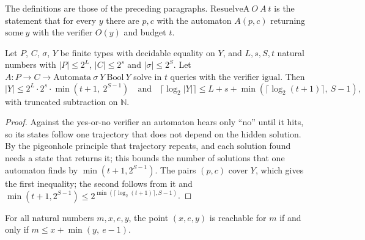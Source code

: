 \begin{definition}
  \label{def:dynamics-cube}
  \leanok
  The definitions are those of the preceding paragraphs. $\mathrm{ResuelveA}\ O\ A\ t$ is the
  statement that for every $y$ there are $p, c$ with the automaton $A(p,c)$ returning
  $\mathrm{some}\ y$ with the verifier $O(y)$ and budget $t$.
  \own{}
\end{definition}

\begin{theorem}
  \label{thm:dynamics-cube-law}
  \leanok
  Let $P$, $C$, $\sigma$, $Y$ be finite types with decidable equality on $Y$, and $L, s, S, t$
  natural numbers with $|P| \le 2^L$, $|C| \le 2^s$ and $|\sigma| \le 2^S$. Let
  $A : P \to C \to \mathrm{Automata}\ \sigma\ Y\ \mathrm{Bool}\ Y$ solve in $t$ queries with the
  verifier $\mathrm{igual}$. Then
  \[
    |Y| \le 2^L \cdot 2^s \cdot \min(t+1,\ 2^{S-1})
    \quad\text{and}\quad
    \lceil \log_2 |Y| \rceil \le L + s + \min(\lceil \log_2 (t+1) \rceil,\ S - 1),
  \]
  with truncated subtraction on $\mathbb{N}$.
  \own{}
\end{theorem}

\begin{proof}
  \leanok
  Against the yes-or-no verifier an automaton hears only ``no'' until it hits, so its states follow
  one trajectory that does not depend on the hidden solution. By the pigeonhole principle that
  trajectory repeats, and each solution found needs a state that returns it; this bounds the number
  of solutions that one automaton finds by $\min(t+1, 2^{S-1})$. The pairs $(p,c)$ cover $Y$, which
  gives the first inequality; the second follows from it and $\min(t+1, 2^{S-1}) \le
  2^{\min(\lceil \log_2 (t+1) \rceil, S-1)}$.
\end{proof}

\begin{theorem}
  \label{thm:dynamics-cube-region}
  \leanok
  For all natural numbers $m, x, e, y$, the point $(x, e, y)$ is reachable for $m$ if and only if
  $m \le x + \min(y,\ e - 1)$.
  \own{}
\end{theorem}

